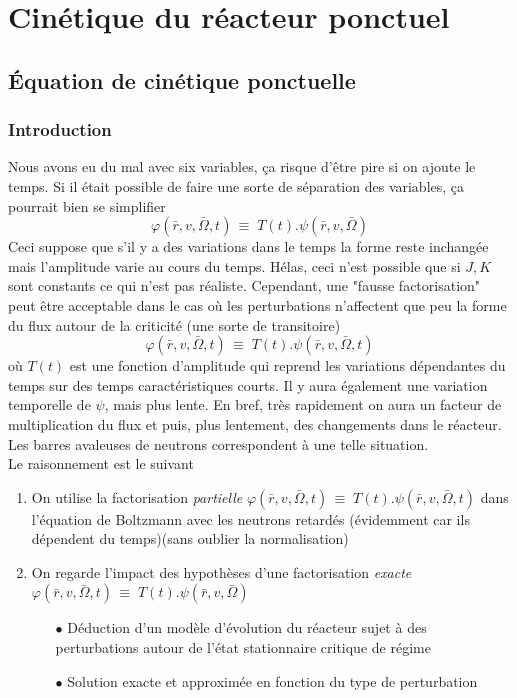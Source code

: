 \chapter{Cinétique du réacteur ponctuel}
\section{Équation de cinétique ponctuelle}
\subsection{Introduction}
Nous avons eu du mal avec six variables, ça risque d'être pire si on ajoute le temps. Si il était 
possible de faire une sorte de séparation des variables, ça pourrait bien se simplifier
\begin{equation}
\varphi (\bar r,v,\bar \Omega ,t)\, \equiv \;T(t).\psi (\bar r,v,\bar \Omega )
\end{equation}
Ceci suppose que s'il y a des variations dans le temps la forme reste inchangée mais l'amplitude 
varie au cours du temps.  Hélas, ceci n'est possible que si $J,K$ sont constants ce qui n'est pas
réaliste. Cependant, une "fausse factorisation" peut être acceptable dans le cas où les perturbations 
n'affectent que peu la forme du flux autour de la criticité (une sorte de transitoire)
\begin{equation}
\varphi (\bar r,v,\bar \Omega ,t)\, \equiv \;T(t).\psi (\bar r,v,\bar \Omega ,t)
\end{equation}
où $T(t)$ est une fonction d'amplitude qui reprend les variations dépendantes du temps sur des temps
caractéristiques courts. Il y aura également une variation temporelle de $\psi$, mais plus lente. En 
bref, très rapidement on aura un facteur de multiplication du flux et puis, plus lentement, des 
changements dans le réacteur. Les barres avaleuses de neutrons correspondent à une telle situation.\\

Le raisonnement est le suivant
\begin{enumerate}
\item On utilise la factorisation \textit{partielle} $\varphi (\bar r,v,\bar \Omega ,t)\, \equiv \;T(t).
\psi (\bar r,v,\bar \Omega ,t)$  dans l'équation de Boltzmann avec les neutrons retardés (évidemment 
car ils dépendent du temps)(sans oublier la normalisation)
\item On regarde l'impact des hypothèses d'une factorisation \textit{exacte} $\varphi (\bar r,v,\bar \Omega ,t)\, \equiv \;T(t).\psi (\bar r,v,\bar \Omega )$
\begin{itemize}
\item[$\bullet$] Déduction d'un modèle d'évolution du réacteur sujet à des perturbations autour de
l'état stationnaire critique de régime
\item[$\bullet$] Solution exacte et approximée en fonction du type de perturbation
\end{itemize}
\end{enumerate}

